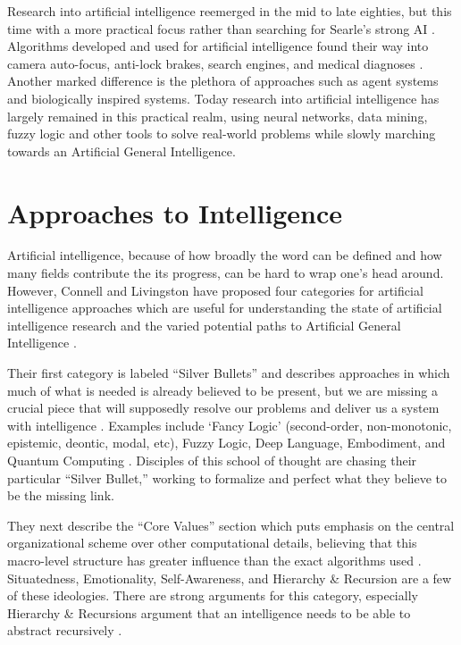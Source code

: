 \documentclass[oneside,12pt,openany]{book}
\begin{document}
	Research into artificial intelligence reemerged in the mid to late eighties, but this time with a more practical focus rather than searching for Searle's strong AI \cite{Jones}. Algorithms developed and used for artificial intelligence found their way into camera auto-focus, anti-lock brakes, search engines, and medical diagnoses \cite{Jones}. Another marked difference is the plethora of approaches such as agent systems and biologically inspired systems. Today research into artificial intelligence has largely remained in this practical realm, using neural networks, data mining, fuzzy logic and other tools to solve real-world problems while slowly marching towards an Artificial General Intelligence.
	
	\section{Approaches to Intelligence}
	
	Artificial intelligence, because of how broadly the word can be defined and how many fields contribute the its progress, can be hard to wrap one's head around. However, Connell and Livingston have proposed four categories for artificial intelligence approaches which are useful for understanding the state of artificial intelligence research and the varied potential paths to Artificial General Intelligence \cite{Connell}.
	
	Their first category is labeled ``Silver Bullets'' and describes approaches in which much of what is needed is already believed to be present, but we are missing a crucial piece that will supposedly resolve our problems and deliver us a system with intelligence \cite{Connell}. Examples include `Fancy Logic' (second-order, non-monotonic, epistemic, deontic, modal, etc), Fuzzy Logic, Deep Language, Embodiment, and Quantum Computing \cite{Connell}. Disciples of this school of thought are chasing their particular ``Silver Bullet,'' working to formalize and perfect what they believe to be the missing link.
	
	They next describe the ``Core Values'' section which puts emphasis on the central organizational scheme over other computational details, believing that this macro-level structure has greater influence than the exact algorithms used \cite{Connell}. Situatedness, Emotionality, Self-Awareness, and Hierarchy \& Recursion are a few of these ideologies. There are strong arguments for this category, especially Hierarchy \& Recursions argument that an intelligence needs to be able to abstract recursively \cite{Connell}.
	
\end{document}
